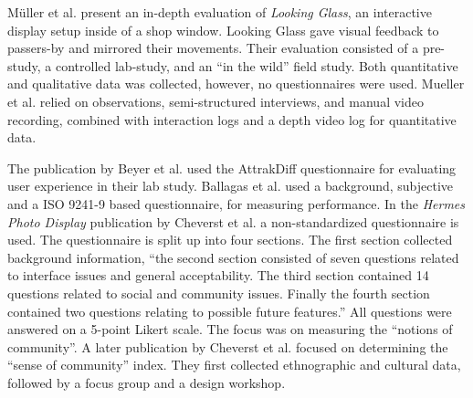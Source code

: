 	M{\"u}ller et al. \cite{Muller2012LookingGlass} present an in-depth evaluation of \textit{Looking Glass}, an interactive display setup inside of a shop window. Looking Glass gave visual feedback to passers-by and mirrored their movements. Their evaluation consisted of a pre-study, a controlled lab-study, and an ``in the wild'' field study. Both quantitative and qualitative data was collected, however, no questionnaires were used. Mueller et al. relied on observations, semi-structured interviews, and manual video recording, combined with interaction logs and a depth video log for quantitative data.

	The publication by Beyer et al. \cite{Beyer2011} used the AttrakDiff questionnaire for evaluating user experience in their lab study. 
	Ballagas et al. \cite{Ballagas2005} used a background, subjective and a ISO 9241-9 based questionnaire, for measuring performance.
	In the \textit{Hermes Photo Display} publication by Cheverst et al. \cite{cheverst2005hermes} a non-standardized questionnaire is used. The questionnaire is split up into four sections. The first section collected background information, ``the second section consisted of seven questions related to interface issues and general acceptability. The third section contained 14 questions related to social and community issues. Finally the fourth section contained two questions relating to possible future features.'' All questions were answered on a 5-point Likert scale. The focus was on measuring the ``notions of community''.
	A later publication by Cheverst et al. \cite{Cheverst2008} focused on determining the ``sense of community'' index. They first collected ethnographic and cultural data, followed by a focus group and a design workshop.








